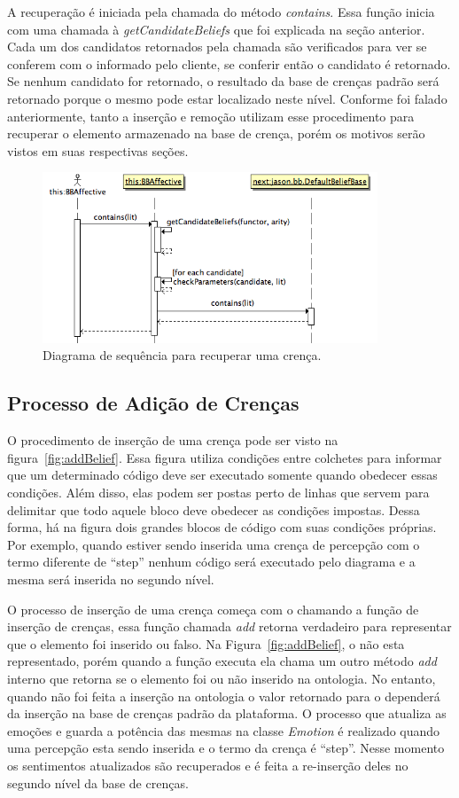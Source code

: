 A recuperação é iniciada pela chamada do método \emph{contains}. Essa função
inicia com uma chamada à \emph{getCandidateBeliefs} que foi explicada na seção anterior.
Cada um dos candidatos retornados pela chamada são verificados para ver se
conferem com o informado pelo cliente, se conferir então o candidato é
retornado. Se nenhum candidato for retornado, o resultado da base de crenças
padrão será retornado porque o mesmo pode estar localizado neste nível.
Conforme foi falado anteriormente, tanto a inserção e remoção utilizam esse
procedimento para recuperar o elemento armazenado na base de crença, porém os
motivos serão vistos em suas respectivas seções.

\begin{figure}
  \centering
  \includegraphics[width=100mm]{figuras/sd-contains.png}
  \caption{Diagrama de sequência para recuperar uma crença.}
  \label{fig:recover}
\end{figure}

\subsection{Processo de Adição de Crenças}

O procedimento de inserção de uma crença pode ser visto na
figura~\ref{fig:addBelief}. Essa figura utiliza condições entre colchetes para
informar que um determinado código deve ser executado somente quando obedecer
essas condições. Além disso, elas podem ser postas perto de linhas que servem
para delimitar que todo aquele bloco deve obedecer as condições impostas.
Dessa forma, há na figura dois grandes blocos de código com suas condições
próprias. Por exemplo, quando estiver sendo inserida uma crença de percepção
com o termo diferente de ``step'' nenhum código será executado pelo diagrama e
a mesma será inserida no segundo nível.

O processo de inserção de uma crença começa com o \jason chamando a função de
inserção de crenças, essa função chamada \emph{add} retorna verdadeiro para
representar que o elemento foi inserido ou falso. Na
Figura~\ref{fig:addBelief}, o \jason não esta representado, porém quando a
função executa ela chama um outro método \emph{add} interno que retorna se o
elemento foi ou não inserido na ontologia. No entanto, quando não foi feita a
inserção na ontologia o valor retornado para o \jason dependerá da inserção na
base de crenças padrão da plataforma. O processo que atualiza as emoções e
guarda a potência das mesmas na classe \emph{Emotion} é realizado quando uma
percepção esta sendo inserida e o termo da crença é ``step''. Nesse momento os
sentimentos atualizados são recuperados e é feita a re-inserção deles no
segundo nível da base de crenças.

